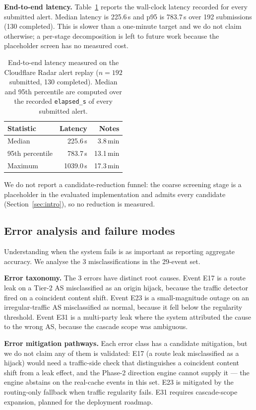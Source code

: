 \textbf{End-to-end latency.} Table~\ref{tab:latency} reports the wall-clock latency recorded for every submitted alert. Median latency is 225.6\,s and p95 is 783.7\,s over 192 submissions (130 completed). This is slower than a one-minute target and we do not claim otherwise; a per-stage decomposition is left to future work because the placeholder screen has no measured cost.

\begin{table}[t]
\centering
\caption{End-to-end latency measured on the Cloudflare Radar alert replay
($n=192$ submitted, 130 completed). Median and 95th percentile are
computed over the recorded \texttt{elapsed\_s} of every submitted alert.}
\label{tab:latency}
\small
\begin{tabular}{l r r}
\hline
\textbf{Statistic} & \textbf{Latency} & \textbf{Notes} \\
\hline
Median            & 225.6\,s & 3.8\,min \\
95th percentile   & 783.7\,s & 13.1\,min \\
Maximum           & 1039.0\,s & 17.3\,min \\
\hline
\end{tabular}
\vspace{2pt}
\parbox{0.92\linewidth}{\footnotesize We do not report a candidate-reduction
funnel: the coarse screening stage is a placeholder in the evaluated
implementation and admits every candidate (Section~\ref{sec:intro}), so no
reduction is measured.}
\end{table}

\subsection{Error analysis and failure modes}
Understanding when the system fails is as important as reporting aggregate accuracy. We analyse the 3 misclassifications in the 29-event set.

\textbf{Error taxonomy.} The 3 errors have distinct root causes. Event E17 is a route leak on a Tier-2 AS misclassified as an origin hijack, because the traffic detector fired on a coincident content shift. Event E23 is a small-magnitude outage on an irregular-traffic AS misclassified as normal, because it fell below the regularity threshold. Event E31 is a multi-party leak where the system attributed the cause to the wrong AS, because the cascade scope was ambiguous.

\textbf{Error mitigation pathways.} Each error class has a candidate mitigation, but we do not claim any of them is validated: E17 (a route leak misclassified as a hijack) would need a traffic-side check that distinguishes a coincident content shift from a leak effect, and the Phase-2 direction engine cannot supply it — the engine abstains on the real-cache events in this set. E23 is mitigated by the routing-only fallback when traffic regularity fails. E31 requires cascade-scope expansion, planned for the deployment roadmap.

